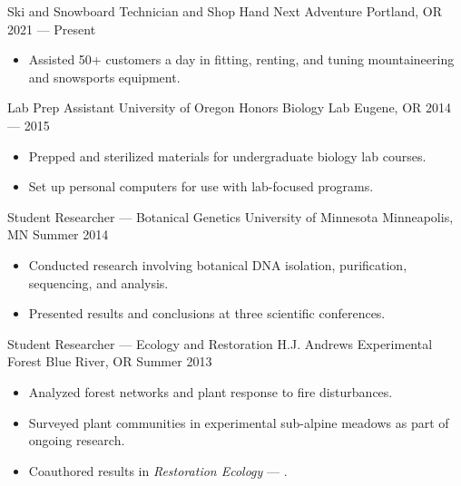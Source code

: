 \showoff
{Ski and Snowboard Technician and Shop Hand}
{Next Adventure}
{Portland, OR}
{2021 --- Present}
\begin{itemize}[label=$\triangleright$]
    \item Assisted 50+ customers a day in fitting, renting, and tuning mountaineering and snowsports equipment.
\end{itemize}

\myBreak

\showoff
{Lab Prep Assistant}
{University of Oregon Honors Biology Lab}
{Eugene, OR}
{2014 --- 2015}
\begin{itemize}[label=$\triangleright$]
    \item Prepped and sterilized materials for undergraduate biology lab courses.
    \item Set up personal computers for use with lab-focused programs.
\end{itemize}

\myBreak

\showoff
{Student Researcher --- Botanical Genetics}
{University of Minnesota}
{Minneapolis, MN}
{Summer 2014}
\begin{itemize}[label=$\triangleright$]
    \item Conducted research involving botanical DNA isolation, purification, sequencing, and analysis.
    \item Presented results and conclusions at three scientific conferences.
\end{itemize}

\myBreak

\showoff
{Student Researcher --- Ecology and Restoration}
{H.J. Andrews Experimental Forest}
{Blue River, OR}
{Summer 2013}
\begin{itemize}[label=$\triangleright$]
    \item Analyzed forest networks and plant response to fire disturbances.
    \item Surveyed plant communities in experimental sub-alpine meadows as part of ongoing research.
    \item Coauthored results in \emph{Restoration Ecology} --- .
\end{itemize}

